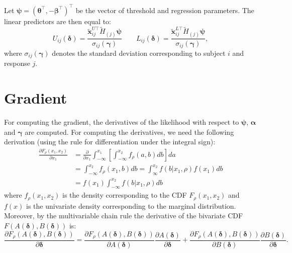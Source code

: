 \documentclass[a4paper,fleqn]{article}
\begin{document}
Let $\bm\psi = (\bm\theta^\top, -\bm\beta^\top)^\top$ be the vector of threshold and regression parameters.
The linear predictors are then equal to:
$$ U_{ij}(\bm\delta) = \frac{\bm {\tilde{x}}_{ij}^{U \top} \tilde H_{(j)}\bm\psi}{\sigma_{ij}(\bm\gamma)} \qquad
L_{ij}(\bm\delta)= \frac{\bm {\tilde{x}}_{ij}^{L \top} \tilde H_{(j)}\bm\psi}{\sigma_{ij}(\bm\gamma)},$$
where $\sigma_{ij}(\bm\gamma)$ denotes the standard deviation corresponding to subject $i$ and response $j$.




\section{Gradient}
For computing the gradient, the derivatives of the likelihood with respect to $\bm\psi$, $\bm\alpha$ and $\bm\gamma$ are computed. For computing the derivatives, we need the following derivation (using the rule for differentiation under the integral sign):
\begin{align}\label{eq:dFdx}
\frac{\partial F_\rho(x_1, x_2)}{\partial x_1} &= \frac{\partial }{\partial x_1}\int_{-\infty}^{x_1}\left[\int_{-\infty}^{x_2} f_\rho(a, b)db\right]da\\ \nonumber
&=\int_{-\infty}^{x_2}f_\rho(x_1, b) db=\int_{\infty}^{x_2}f(b|x_1, \rho)f(x_1) db\\\nonumber
&=f(x_1) \int_{-\infty}^{x_2}f(b|x_1, \rho)db
\end{align}
where $f_\rho(x_1, x_2)$ is the density corresponding to the CDF $F_\rho(x_1,x_2)$ and $f(x)$ is the univariate density corresponding to the marginal distribution.
Moreover, by the multivariable chain rule the derivative of the bivariate CDF $F(A(\bm\delta), B(\bm\delta))$ is:
$$  \frac{\partial F_\rho(A(\bm\delta), B(\bm\delta))}{\partial\bm\delta} = \frac{\partial F_\rho(A(\bm\delta), B(\bm\delta))}{\partial A(\bm\delta)}\frac{\partial A(\bm\delta)}{\partial\bm\delta} +
  \frac{\partial F_\rho(A(\bm\delta), B(\bm\delta))}{\partial B(\bm\delta)}\frac{\partial B(\bm\delta)}{\partial\bm\delta}.
$$
\end{document}

